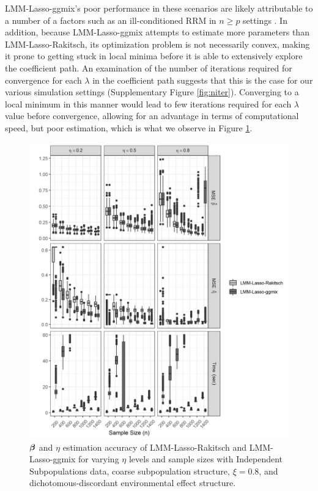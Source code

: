 LMM-Lasso-ggmix's poor performance in these scenarios are likely attributable to a number of a factors such as an ill-conditioned RRM  in $n \ge p$ settings \citep{ledoit2004well}. In addition, because LMM-Lasso-ggmix attempts to estimate more parameters than LMM-Lasso-Rakitsch, its optimization problem is not necessarily convex, making it prone to getting stuck in local minima before it is able to extensively explore the coefficient path. An examination of the number of iterations required for convergence for each $\lambda$ in the coefficient path suggests that this is the case for our various simulation settings (Supplementary Figure \ref{fig:niter}). Converging to a local minimum in this manner would lead to few iterations required for each $\lambda$ value before convergence, allowing for an advantage in terms of computational speed, but poor estimation, which is what we observe in Figure \ref{fig:eta_beta_mse}.

\begin{figure}[H]
    \centering
    \includegraphics[scale = 1]{figures/eta_beta_hat.png}
     \caption{$\boldsymbol{\beta}{}$ and $\eta$ estimation accuracy of LMM-Lasso-Rakitsch and LMM-Lasso-ggmix for varying $\eta$ levels and sample sizes with Independent Subpopulations data, coarse subpopulation structure, $\xi = 0.8$, and dichotomous-discordant environmental effect structure.}
    \label{fig:eta_beta_mse}
\end{figure}

